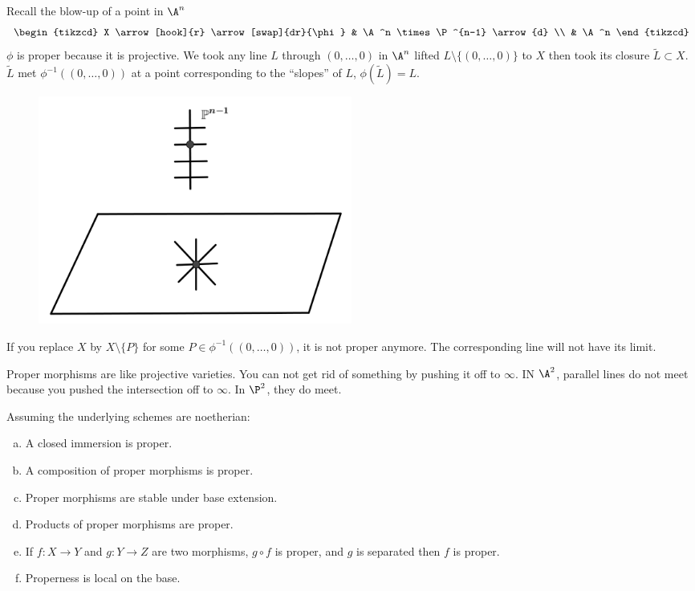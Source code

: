 \begin{ex}
Recall the blow-up of a point in $\A^n$
	\[
	\begin{tikzcd}
	X \arrow[hook]{r} \arrow[swap]{dr}{\phi} & \A^n \times \P^{n-1} \arrow{d} \\
	& \A^n
	\end{tikzcd}
	\]
$\phi$ is proper because it is projective. We took any line $L$ through $(0,\ldots,0)$ in $\A^n$ lifted $L \setminus \{(0,\ldots,0)\}$ to $X$ then took its closure $\tilde{L} \subset X$. $\tilde{L}$ met $\phi^{-1}((0,\ldots,0))$ at a point corresponding to the ``slopes'' of $L$, $\phi(\tilde{L})=L$.
	\begin{figure}[H]
	   \centering
	   \includegraphics[width=0.5\textwidth]{projplane.png} 
	\end{figure}
If you replace $X$ by $X \setminus \{P\}$ for some $P \in \phi^{-1}((0,\ldots,0))$, it is not proper anymore. The corresponding line will not have its limit.
\end{ex}


Proper morphisms are like projective varieties. You can not get rid of something by pushing it off to $\infty$. IN $\A^2$, parallel lines do not meet because you pushed the intersection off to $\infty$. In $\P^2$, they do meet.


\begin{cor}
Assuming the underlying schemes are noetherian:
\begin{enumerate}[(a)]
\item A closed immersion is proper.
\item A composition of proper morphisms is proper.
\item Proper morphisms are stable under base extension.
\item Products of proper morphisms are proper.
\item If $f: X \to Y$ and $g: Y \to Z$ are two morphisms, $g \circ f$ is proper, and $g$ is separated then $f$ is proper.
\item Properness is local on the base.
\end{enumerate}
\end{cor}


